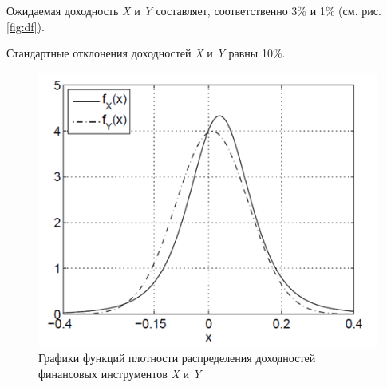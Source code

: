 \documentclass[financial_risks_lectures.tex]{subfiles}
\begin{document}
\begin{frame}[shrink=15]
Ожидаемая доходность \textit{X }и \textit{Y} составляет, соответственно 3\% и 1\% (см. рис. \autoref{fig:df}).

Стандартные отклонения доходностей \textit{X} и \textit{Y} равны 10\%.
\begin{figure}
	\centering
	\includegraphics[scale=0.6]{img/expected_shortfall_df.png}
	\caption{Графики функций плотности распределения доходностей финансовых инструментов \textit{X }и \textit{Y}}
	\label{fig:df}	
\end{figure}
\end{frame}
\end{document}
